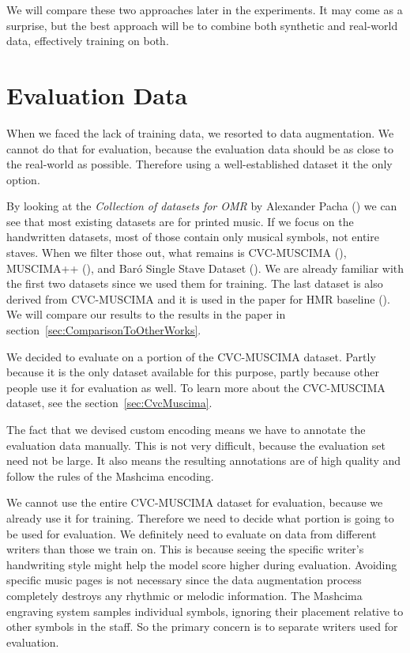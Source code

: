 We will compare these two approaches later in the experiments. It may come as a surprise, but the best approach will be to combine both synthetic and real-world data, effectively training on both.


\section{Evaluation Data}

When we faced the lack of training data, we resorted to data augmentation. We cannot do that for evaluation, because the evaluation data should be as close to the real-world as possible. Therefore using a well-established dataset it the only option.

By looking at the \emph{Collection of datasets for OMR} by Alexander Pacha (\cite{Pacha}) we can see that most existing datasets are for printed music. If we focus on the handwritten datasets, most of those contain only musical symbols, not entire staves. When we filter those out, what remains is CVC-MUSCIMA (\cite{CvcMuscima}), MUSCIMA++ (\cite{MuscimaPP}), and Baró Single Stave Dataset (\cite{HmrBaseline}). We are already familiar with the first two datasets since we used them for training. The last dataset is also derived from CVC-MUSCIMA and it is used in the paper for HMR baseline (\cite{HmrBaseline}). We will compare our results to the results in the paper in section~\ref{sec:ComparisonToOtherWorks}.

We decided to evaluate on a portion of the CVC-MUSCIMA dataset. Partly because it is the only dataset available for this purpose, partly because other people use it for evaluation as well. To learn more about the CVC-MUSCIMA dataset, see the section~\ref{sec:CvcMuscima}.

The fact that we devised custom encoding means we have to annotate the evaluation data manually. This is not very difficult, because the evaluation set need not be large. It also means the resulting annotations are of high quality and follow the rules of the Mashcima encoding.

We cannot use the entire CVC-MUSCIMA dataset for evaluation, because we already use it for training. Therefore we need to decide what portion is going to be used for evaluation. We definitely need to evaluate on data from different writers than those we train on. This is because seeing the specific writer's handwriting style might help the model score higher during evaluation. Avoiding specific music pages is not necessary since the data augmentation process completely destroys any rhythmic or melodic information. The Mashcima engraving system samples individual symbols, ignoring their placement relative to other symbols in the staff. So the primary concern is to separate writers used for evaluation.

